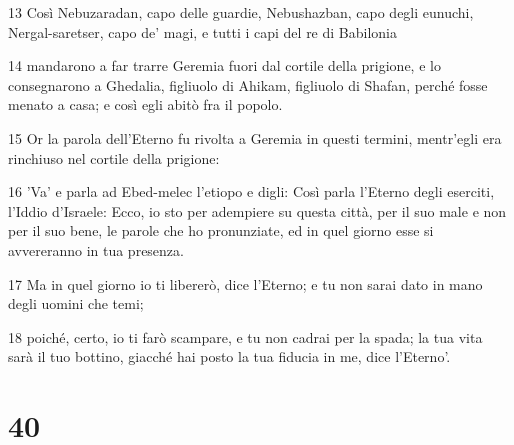 \par 13 Così Nebuzaradan, capo delle guardie, Nebushazban, capo degli eunuchi, Nergal-saretser, capo de' magi, e tutti i capi del re di Babilonia
\par 14 mandarono a far trarre Geremia fuori dal cortile della prigione, e lo consegnarono a Ghedalia, figliuolo di Ahikam, figliuolo di Shafan, perché fosse menato a casa; e così egli abitò fra il popolo.
\par 15 Or la parola dell'Eterno fu rivolta a Geremia in questi termini, mentr'egli era rinchiuso nel cortile della prigione:
\par 16 'Va' e parla ad Ebed-melec l'etiopo e digli: Così parla l'Eterno degli eserciti, l'Iddio d'Israele: Ecco, io sto per adempiere su questa città, per il suo male e non per il suo bene, le parole che ho pronunziate, ed in quel giorno esse si avvereranno in tua presenza.
\par 17 Ma in quel giorno io ti libererò, dice l'Eterno; e tu non sarai dato in mano degli uomini che temi;
\par 18 poiché, certo, io ti farò scampare, e tu non cadrai per la spada; la tua vita sarà il tuo bottino, giacché hai posto la tua fiducia in me, dice l'Eterno'.

\chapter{40}

